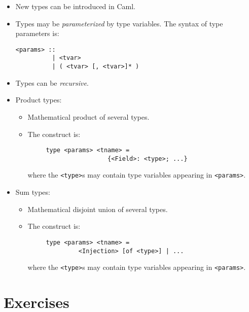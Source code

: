 \begin{itemize}
\item New types can be introduced in Caml.
\item Types may be {\em parameterized} by type variables. The syntax of type
parameters is:
\begin{verbatim}
<params> ::
          | <tvar>
          | ( <tvar> [, <tvar>]* )
\end{verbatim}
\item Types can be {\em recursive}.

\item Product types:
  \begin{itemize}
  \item Mathematical product of several types.
  \item The construct is:
     \begin{verbatim}
     type <params> <tname> =
                      {<Field>: <type>; ...}
     \end{verbatim}
     where the \verb"<type>"s may contain type variables appearing in
     \verb"<params>".
  \end{itemize}
\item Sum types:
  \begin{itemize}
  \item Mathematical disjoint union of several types.
  \item The construct is:
     \begin{verbatim}
     type <params> <tname> =
              <Injection> [of <type>] | ...
     \end{verbatim}
     where the \verb"<type>"s may contain type variables appearing in
     \verb"<params>".
  \end{itemize}
\end{itemize}

\section*{Exercises}

